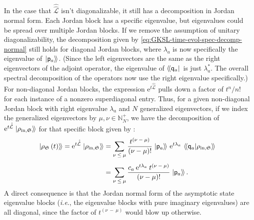 \documentclass[preprints,article,accept,moreauthors,pdftex]{Definitions/mdpi}
\begin{document}
\begin{paracol}{2}
In the case that $\hat{\hat{\mathcal{L}}}$ isn’t diagonalizable, it still has a decomposition in Jordan normal form. Each Jordan block has a specific eigenvalue, but eigenvalues could be spread over multiple Jordan blocks. If we remove the assumption of unitary diagonalizability, the decomposition given by \eqref{eq:GKSL-time-evol-spec-decomp-normal} still holds for diagonal Jordan blocks, where $\lambda_{a}$ is now specifically the eigenvalue of $\left.\ket{\mathsf{p}_{a}}\!\right\rangle$. (Since the left eigenvectors are the same as the right eigenvectors of the adjoint operator, the eigenvalue of $\left\langle\!\bra{\mathsf{q}_{a}}\right.$ is just $\lambda_{a}^{\ast}$. The overall spectral decomposition of the operators now use the right eigenvalue specifically.) For non-diagonal Jordan blocks, the expression $\mathrm{e}^{t\hat{\hat{\mathcal{L}}}}$ pulls down a factor of $t^{n}/n!$ for each instance of a nonzero superdiagonal entry. Thus, for a given non-diagonal Jordan block with right eigenvalue $\lambda_{a}$ and $N$ generalized eigenvectors, if we index the generalized eigenvectors by $\mu,\nu\in\mathbb{N}_{N}^{+}$, we have the decomposition of $\mathrm{e}^{t\hat{\hat{\mathcal{L}}}}\left.\ket{\rho_{\mathrm{in},\mathfrak{S}}}\!\right\rangle$ for that specific block given by \cite{Albert14, Albert18}:
\begin{equation}
    \label{eq:GKSL-time-evol-spec-decomp}
    \begin{split}
        \left.\ket{\rho_{\mathfrak{S}}\left(t\right)}\!\right\rangle = \mathrm{e}^{t\hat{\hat{\mathcal{L}}}}\left.\ket{\rho_{\mathrm{in}, \mathfrak{S}}}\!\right\rangle &= \sum_{\nu\:\leq\:\mu}\frac{t^{\left(\nu\:-\:\mu\right)}}{\left(\nu-\mu\right)!} \left.\ket{\mathsf{p}_{a}}\!\right\rangle\, \mathrm{e}^{t\lambda_{a}}\,\left\langle\!\Braket{\mathsf{q}_{a}\!|\!\rho_{\mathrm{in},\mathfrak{S}}}\!\right\rangle \\[4pt]
        &= \sum_{\nu\:\leq\:\mu}\frac{c_{a}\:\mathrm{e}^{t\lambda_{a}}\:t^{\left(\nu\:-\:\mu\right)}}{\left(\nu-\mu\right)!} \left.\ket{\mathsf{p}_{a}}\!\right\rangle.
    \end{split}
\end{equation}
A direct consequence is that the Jordan normal form of the asymptotic state eigenvalue blocks (\emph{i.e.}, the eigenvalue blocks with pure imaginary eigenvalues) are all diagonal, since the factor of $t^{\left(\nu\:-\:\mu\right)}$ would blow up otherwise.


\end{paracol}
\end{document}
